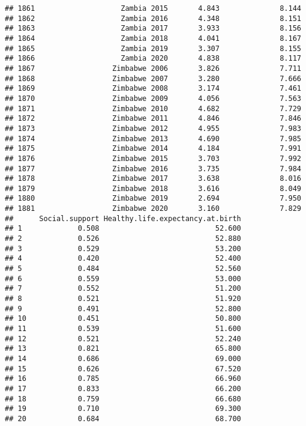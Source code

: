 \documentclass[
]{article}
\begin{document}
\begin{verbatim}
## 1861                    Zambia 2015       4.843              8.144
## 1862                    Zambia 2016       4.348              8.151
## 1863                    Zambia 2017       3.933              8.156
## 1864                    Zambia 2018       4.041              8.167
## 1865                    Zambia 2019       3.307              8.155
## 1866                    Zambia 2020       4.838              8.117
## 1867                  Zimbabwe 2006       3.826              7.711
## 1868                  Zimbabwe 2007       3.280              7.666
## 1869                  Zimbabwe 2008       3.174              7.461
## 1870                  Zimbabwe 2009       4.056              7.563
## 1871                  Zimbabwe 2010       4.682              7.729
## 1872                  Zimbabwe 2011       4.846              7.846
## 1873                  Zimbabwe 2012       4.955              7.983
## 1874                  Zimbabwe 2013       4.690              7.985
## 1875                  Zimbabwe 2014       4.184              7.991
## 1876                  Zimbabwe 2015       3.703              7.992
## 1877                  Zimbabwe 2016       3.735              7.984
## 1878                  Zimbabwe 2017       3.638              8.016
## 1879                  Zimbabwe 2018       3.616              8.049
## 1880                  Zimbabwe 2019       2.694              7.950
## 1881                  Zimbabwe 2020       3.160              7.829
##      Social.support Healthy.life.expectancy.at.birth
## 1             0.508                           52.600
## 2             0.526                           52.880
## 3             0.529                           53.200
## 4             0.420                           52.400
## 5             0.484                           52.560
## 6             0.559                           53.000
## 7             0.552                           51.200
## 8             0.521                           51.920
## 9             0.491                           52.800
## 10            0.451                           50.800
## 11            0.539                           51.600
## 12            0.521                           52.240
## 13            0.821                           65.800
## 14            0.686                           69.000
## 15            0.626                           67.520
## 16            0.785                           66.960
## 17            0.833                           66.200
## 18            0.759                           66.680
## 19            0.710                           69.300
## 20            0.684                           68.700

\end{verbatim}
\end{document}
